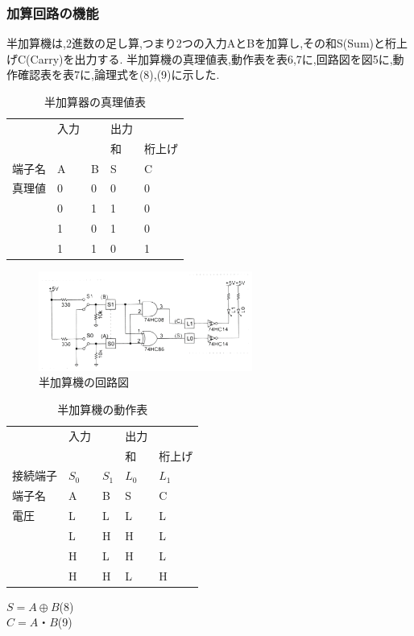\documentclass[twocolumn, 10pt,a4j]{jsarticle}
\begin{document}
  \subsubsection{加算回路の機能}
    半加算機は,2進数の足し算,つまり2つの入力AとBを加算し,その和S(Sum)と桁上げC(Carry)を出力する.
    半加算機の真理値表,動作表を表6,7に,回路図を図5に,動作確認表を表7に,論理式を(8),(9)に示した.
    \begin{table}[]
      \centering
      \caption{半加算器の真理値表}
      \label{my-label}
      \begin{tabular}{l|ll|ll|}
          & 入力 &   & 出力 &     \\ \cline{4-5} 
          &  &   & 和  & 桁上げ \\ \hline
      端子名 & A  & B & S  & C   \\ \hline
      真理値 & 0  & 0 & 0  & 0   \\
          & 0  & 1 & 1  & 0   \\
          & 1  & 0 & 1  & 0   \\
          & 1  & 1 & 0  & 1  
      \end{tabular}
    \end{table}
    \begin{figure}[H]
      \begin{center}
        \includegraphics[width=7cm]{../img/half_adder/half_ader_kairo.png}
        \caption{半加算機の回路図}
      \end{center}
    \end{figure}
    \begin{table}[H]
      \centering
      \caption{半加算機の動作表}
      \label{my-label}
        \begin{tabular}{l|ll|ll|}
            & 入力      &         & 出力      &         \\ \cline{4-5} 
            &         &         & 和       & 桁上げ     \\ \hline
        接続端子 & $S_{0}$ & $S_{1}$ & $L_{0}$ & $L_{1}$ \\ \hline
        端子名  & A       & B       & S       & C       \\ \hline
        電圧   & L       & L       & L       & L       \\
            & L       & H       & H       & L       \\
            & H       & L       & H       & L       \\
            & H       & H       & L       & H      
        \end{tabular}
    \end{table}
    \begin{center}
      $S = A \oplus B$\quad(8) \\
      $C = A・B$\quad(9) \\  
    \end{center}
\end{document}
